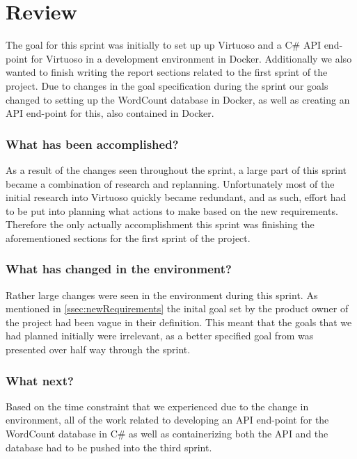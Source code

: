 \section{Review}
The goal for this sprint was initially to set up up Virtuoso and a C\# API end-point for Virtuoso in a development environment in Docker. Additionally we also wanted to finish writing the report sections related to the first sprint of the \knox{} project. Due to changes in the goal specification during the sprint our goals changed to setting up the WordCount database in Docker, as well as creating an API end-point for this, also contained in Docker.

\subsubsection*{What has been accomplished?}
As a result of the changes seen throughout the sprint, a large part of this sprint became a combination of research and replanning. Unfortunately most of the initial research into Virtuoso quickly became redundant, and as such, effort had to be put into planning what actions to make based on the new requirements. Therefore the only actually accomplishment this sprint was finishing the aforementioned sections for the first sprint of the \knox{} project.  

\subsubsection*{What has changed in the environment?}
Rather large changes were seen in the environment during this sprint. As mentioned in \ref{ssec:newRequirements} the inital goal set by the product owner of the \knox{} project had been vague in their definition. This meant that the goals that we had planned initially were irrelevant, as a better specified goal from \knox{} was presented over half way through the sprint. 

\subsubsection*{What next?}
Based on the time constraint that we experienced due to the change in environment, all of the work related to developing an API end-point for the WordCount database in C\# as well as containerizing both the API and the database had to be pushed into the third sprint.
